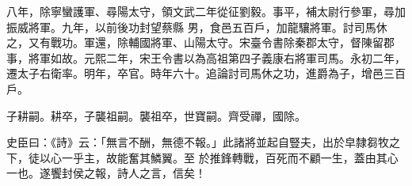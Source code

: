 \begin{pinyinscope}
 八年，除寧蠻護軍、尋陽太守，領文武二年從征劉毅。事平，補太尉行參軍，尋加振威將軍。九年，以前後功封望蔡縣
 男，食邑五百戶，加龍驤將軍。討司馬休之，又有戰功。軍還，除輔國將軍、山陽太守。宋臺令書除秦郡太守，督陳留郡事，將軍如故。元熙二年，宋王令書以為高祖第四子義康右將軍司馬。永初二年，遷太子右衛率。明年，卒官。時年六十。追論討司馬休之功，進爵為子，增邑三百戶。



 子耕嗣。耕卒，子襲祖嗣。襲祖卒，世寶嗣。齊受禪，國除。



 史臣曰：《詩》云：「無言不酬，無德不報。」此諸將並起自豎夫，出於皁隸芻牧之下，徒以心一乎主，故能奮其鱗翼。至
 於推鋒轉戰，百死而不顧一生，蓋由其心一也。遂饗封侯之報，詩人之言，信矣！



\end{pinyinscope}